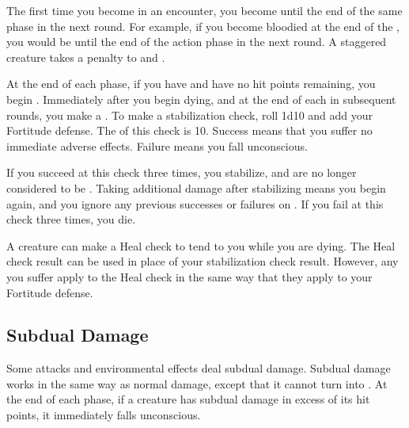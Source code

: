         \label{Staggered}
        The first time you become  in an encounter, you become  until the end of the same phase in the next round.
        For example, if you become bloodied at the end of the , you would be  until the end of the action phase in the next round.
        A staggered creature takes a  penalty to  and .

        \label{Dying} At the end of each phase, if you have  and have no hit points remaining, you begin .
        Immediately after you begin dying, and at the end of each  in subsequent rounds, you make a .
        To make a stabilization check, roll 1d10 and add your Fortitude defense.
        The  of this check is 10.
        Success means that you suffer no immediate adverse effects.
        Failure means you fall unconscious.

        If you succeed at this check three times, you stabilize, and are no longer considered to be .
        Taking additional damage after stabilizing means you begin  again, and you ignore any previous successes or failures on .
        If you fail at this check three times, you die.

        A creature can make a Heal check to tend to you while you are dying.
        The Heal check result can be used in place of your stabilization check result.
        However, any  you suffer apply to the Heal check in the same way that they apply to your Fortitude defense.

    \subsection{Subdual Damage}\label{Subdual Damage}
        Some attacks and environmental effects deal subdual damage.
        Subdual damage works in the same way as normal damage, except that it cannot turn into .
        At the end of each phase, if a creature has subdual damage in excess of its hit points, it immediately falls unconscious.

